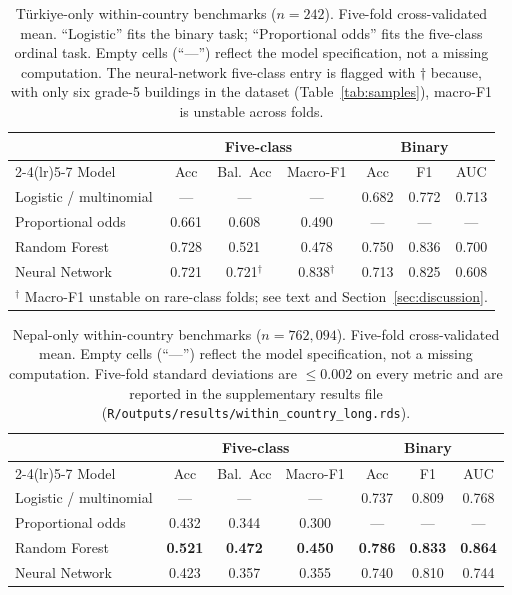 \documentclass[11pt,a4paper]{article}
\begin{document}
\begin{table}[!t]
\centering
\caption{T\"urkiye-only within-country benchmarks ($n=242$). Five-fold cross-validated mean. ``Logistic'' fits the binary task; ``Proportional odds'' fits the five-class ordinal task. Empty cells (``---'') reflect the model specification, not a missing computation. The neural-network five-class entry is flagged with $\dagger$ because, with only six grade-5 buildings in the dataset (Table~\ref{tab:samples}), macro-F1 is unstable across folds.}
\label{tab:turkiye-only}
\small
\begin{tabular}{l ccc ccc}
\toprule
& \multicolumn{3}{c}{\textbf{Five-class}}
& \multicolumn{3}{c}{\textbf{Binary}}\\
\cmidrule(lr){2-4}\cmidrule(lr){5-7}
Model & Acc & Bal.\ Acc & Macro-F1 & Acc & F1 & AUC \\
\midrule
Logistic / multinomial      & ---   & ---   & ---            & 0.682 & 0.772 & 0.713 \\
Proportional odds           & 0.661 & 0.608 & 0.490          & ---   & ---   & ---   \\
Random Forest               & 0.728 & 0.521 & 0.478          & 0.750 & 0.836 & 0.700 \\
Neural Network              & 0.721 & 0.721$^\dagger$ & 0.838$^\dagger$ & 0.713 & 0.825 & 0.608 \\
\bottomrule
\multicolumn{7}{l}{\footnotesize $^\dagger$ Macro-F1 unstable on rare-class folds; see text and Section~\ref{sec:discussion}.}
\end{tabular}
\end{table}

\begin{table}[!t]
\centering
\caption{Nepal-only within-country benchmarks ($n=762{,}094$). Five-fold cross-validated mean. Empty cells (``---'') reflect the model specification, not a missing computation. Five-fold standard deviations are $\le 0.002$ on every metric and are reported in the supplementary results file (\texttt{R/outputs/results/within\_country\_long.rds}).}
\label{tab:nepal-only}
\small
\begin{tabular}{l ccc ccc}
\toprule
& \multicolumn{3}{c}{\textbf{Five-class}}
& \multicolumn{3}{c}{\textbf{Binary}}\\
\cmidrule(lr){2-4}\cmidrule(lr){5-7}
Model & Acc & Bal.\ Acc & Macro-F1 & Acc & F1 & AUC \\
\midrule
Logistic / multinomial    & ---   & ---   & ---   & 0.737 & 0.809 & 0.768 \\
Proportional odds         & 0.432 & 0.344 & 0.300 & ---   & ---   & ---   \\
Random Forest             & \textbf{0.521} & \textbf{0.472} & \textbf{0.450} & \textbf{0.786} & \textbf{0.833} & \textbf{0.864} \\
Neural Network            & 0.423 & 0.357 & 0.355 & 0.740 & 0.810 & 0.744 \\
\bottomrule
\end{tabular}
\end{table}
\end{document}
